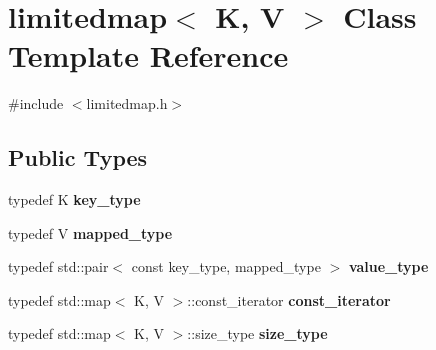 \hypertarget{classlimitedmap}{}\section{limitedmap$<$ K, V $>$ Class Template Reference}
\label{classlimitedmap}


{\ttfamily \#include $<$limitedmap.\+h$>$}

\subsection*{Public Types}
\begin{DoxyCompactItemize}
\item 
\mbox{\label{classlimitedmap_aebf71255c65df699225cdcefe88717b9}} 
typedef K {\bfseries key\+\_\+type}
\item 
\mbox{\label{classlimitedmap_a8bd6b8e7f91f0a141c91c382b492c03c}} 
typedef V {\bfseries mapped\+\_\+type}
\item 
\mbox{\label{classlimitedmap_a8a6c4972e628b71bf43eeb757dafdce5}} 
typedef std\+::pair$<$ const key\+\_\+type, mapped\+\_\+type $>$ {\bfseries value\+\_\+type}
\item 
\mbox{\label{classlimitedmap_ab0a3e4f2ec7c82359300c83a35ae2500}} 
typedef std\+::map$<$ K, V $>$\+::const\+\_\+iterator {\bfseries const\+\_\+iterator}
\item 
\mbox{\label{classlimitedmap_a1c564b323f94e182e56aa27975e5f9d1}} 
typedef std\+::map$<$ K, V $>$\+::size\+\_\+type {\bfseries size\+\_\+type}
\end{DoxyCompactItemize}
